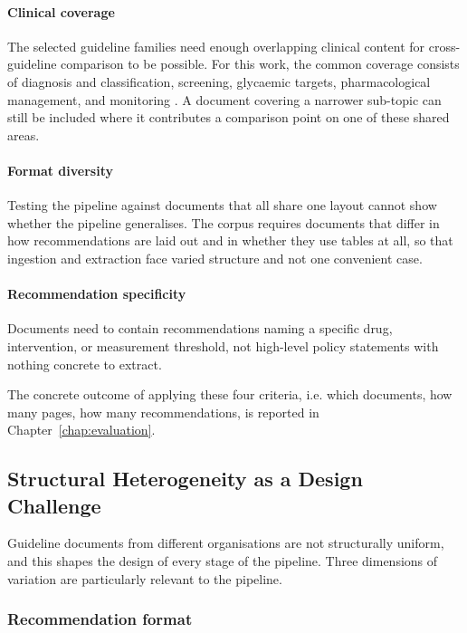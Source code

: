 \paragraph{Clinical coverage}
The selected guideline families need enough overlapping clinical content
for cross-guideline comparison to be possible. For this work, the common
coverage consists of diagnosis and classification, screening, glycaemic
targets, pharmacological management, and monitoring
\cite{ADA2026,NICE_T2_2026,IDF2025,CanadaDiabetes_Ch3}. A document covering
a narrower sub-topic can still be included where it contributes a
comparison point on one of these shared areas.

\paragraph{Format diversity}
Testing the pipeline against documents that all share one layout cannot show whether the pipeline generalises. The corpus requires documents that differ in how recommendations are laid out and in whether they use tables at all, so that ingestion and extraction face varied structure and not one convenient case.

\paragraph{Recommendation specificity}
Documents need to contain recommendations naming a specific drug, intervention, or measurement threshold, not high-level policy statements with nothing concrete to extract.

 The concrete outcome of applying these four criteria, i.e. which documents, how many pages, how many recommendations, is reported in Chapter~\ref{chap:evaluation}.

\subsection{Structural Heterogeneity as a Design Challenge}
\label{sec:heterogeneity}

Guideline documents from different organisations are not structurally uniform, and this shapes the design of every stage of the pipeline. Three dimensions of variation are particularly relevant to the pipeline.

\subsubsection{Recommendation format}

